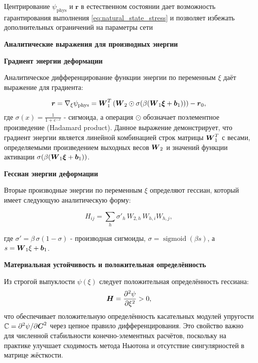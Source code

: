 Центрирование $\psi_{\mathrm{phys}}$ и $\mathbf{r}$ в естественном состоянии 
дает возможность гарантирования выполнения \eqref{eq:natural_state_stress} и
позволяет избежать дополнительных ограничений на параметры сети


\textbf{Аналитические выражения для производных энергии}

\textbf{Градиент энергии деформации}

Аналитическое дифференцирование функции энергии по переменным \(\xi\) даёт выражение для градиента:

\begin{equation}
 \boldsymbol{r} = \nabla_\xi \psi_{\mathrm{phys}} = \boldsymbol{W}_1^T \left( \boldsymbol{W}_2 \odot \sigma(\beta (\boldsymbol{W}_1 \boldsymbol{\xi} + \boldsymbol{b}_1)) \right) - \boldsymbol{r}_0,
\label{eq:energy_gradient}
\end{equation}
где $\sigma(x) = \frac{1}{1 + e^{-x}}$ - сигмоида, 
а операция $\odot$ обозначает поэлементное произведение (Hadamard product). 
Данное выражение демонстрирует, что градиент энергии является линейной комбинацией строк матрицы $\boldsymbol{W}_1^T$ с весами, 
определяемыми произведением выходных весов $\boldsymbol{W}_2$ и значений функции активации $\sigma(\beta (\boldsymbol{W}_1 \boldsymbol{\xi} + \boldsymbol{b}_1))$.

\textbf{Гессиан энергии деформации}

Вторые производные энергии по переменным \(\xi\) определяют гессиан, который имеет следующую аналитическую форму:

\begin{equation}
 H_{ij} = \sum_h \sigma'_h\,W_{2,h}\,W_{h,i}W_{h,j},
\label{eq:energy_hessian}
\end{equation}

где $\sigma' = \beta\,\sigma(1-\sigma)$ - производная сигмоиды, 
$\sigma=\operatorname{sigmoid}(\beta s)$, а $s=\boldsymbol{W}_1\xi+\boldsymbol{b}_1$.

\textbf{Материальная устойчивость и положительная определённость}

Из строгой выпуклости \(\psi(\xi)\) следует положительная определённость гессиана:
\begin{equation}
 \boldsymbol{H} = \frac{\partial^2\psi}{\partial\xi^2} > 0,
\label{eq:positive_hessian}
\end{equation}
что обеспечивает положительную определённость касательных модулей упругости 
$\mathbb{C} = \partial^2\psi/\partial\boldsymbol{C}^2$ через цепное правило дифференцирования. 
Это свойство важно для численной стабильности конечно-элементных расчётов, 
поскольку на практике улучшает сходимость метода Ньютона и отсутствие сингулярностей в матрице жёсткости.

